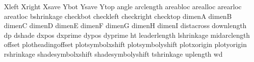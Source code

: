 \newskip\!Xleft                %
\newskip\!Xright               %
\newskip\!Xsave                %
\newskip\!Ybot                 %
\newskip\!Ysave                %
\newskip\!Ytop                 %
\newskip\!angle                %
\newskip\!arclength            %
\newskip\!areabloc             %
\newskip\!arealloc             %
\newskip\!arearloc             %
\newskip\!areatloc             %
\newskip\!bshrinkage           %
\newskip\!checkbot             %
\newskip\!checkleft            %
\newskip\!checkright           %
\newskip\!checktop             %
\newdimen\!dimenA               %
\newdimen\!dimenB               %
\newdimen\!dimenC               %
\newdimen\!dimenD               %
\newdimen\!dimenE               %
\newdimen\!dimenF               %
\newdimen\!dimenG               %
\newdimen\!dimenH               %
\newdimen\!dimenI               %
\newdimen\!distacross           %
\newdimen\!downlength           %
\newdimen\!dp                   %
\newdimen\!dshade               %
\newdimen\!dxpos                %
\newdimen\!dxprime              %
\newdimen\!dypos                %
\newdimen\!dyprime              %
\newdimen\!ht                   %
\newdimen\!leaderlength         %
\newdimen\!lshrinkage           %
\newdimen\!midarclength         %
\newdimen\!offset               %
\newdimen\!plotheadingoffset    %
\newdimen\!plotsymbolxshift     %
\newdimen\!plotsymbolyshift     %
\newdimen\!plotxorigin          %
\newdimen\!plotyorigin          %
\newdimen\!rshrinkage           %
\newdimen\!shadesymbolxshift    %
\newdimen\!shadesymbolyshift    %
\newdimen\!tshrinkage           %
\newdimen\!uplength             %
\newdimen\!wd                   %
